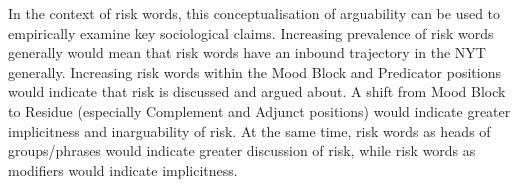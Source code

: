



	  In the context of risk words, this conceptualisation of arguability can be used to empirically examine key sociological claims. Increasing prevalence of risk words generally would mean that risk words have an inbound trajectory in the NYT generally. Increasing risk words within the Mood Block and Predicator positions would indicate that risk is discussed and argued about. A shift from Mood Block to Residue (especially Complement and Adjunct positions) would indicate greater implicitness and inarguability of risk. At the same time, risk words as heads of groups/phrases would indicate greater discussion of risk, while risk words as modifiers would indicate implicitness.

